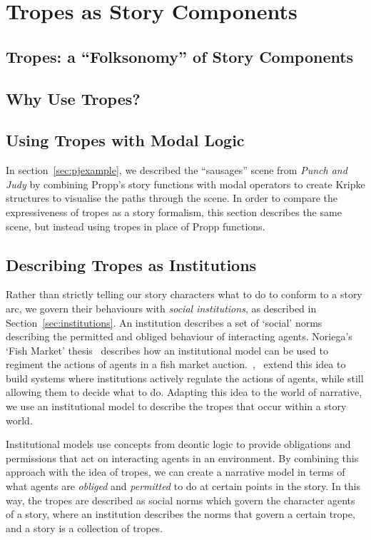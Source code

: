 \chapter{Tropes as Story Components}
\label{cha:tropes}
\section{Tropes: a ``Folksonomy'' of Story Components}

\section{Why Use Tropes?}

\section{Using Tropes with Modal Logic}
In section~\ref{sec:pjexample}, we described the ``sausages'' scene from
\emph{Punch and Judy} by combining Propp's story functions with modal operators
to create Kripke structures to visualise the paths through the scene. In order
to compare the expressiveness of tropes as a story formalism, this section
describes the same scene, but instead using tropes in place of Propp functions.


\section{Describing Tropes as Institutions} %
\label{sec:tropes-as-insts}
Rather than strictly telling our story characters what to do to conform to a
story arc, we govern their behaviours with \emph{social institutions}, as
described in Section~\ref{sec:institutions}. An institution describes a set of `social' norms describing the permitted and obliged behaviour of interacting agents. Noriega's `Fish Market' thesis~\cite{noriega1999agent} describes how an institutional model can be used to regiment the actions of agents in a fish market auction.~\cite{cliffe2007specifying},~\cite{lee2013decoupling} extend this idea to build systems where institutions actively regulate the actions of agents, while still allowing them to decide what to do. Adapting this idea to the world of narrative, we use an institutional model to describe the tropes that occur within a story world.

Institutional models use concepts from deontic logic to provide obligations and permissions that act on interacting agents in an environment. By combining this approach with the idea of tropes, we can create a narrative model in terms of what agents are \emph{obliged} and \emph{permitted} to do at certain points in the story. In this way, the tropes are described as social norms which govern the character agents of a story, where an institution describes the norms that govern a certain trope, and a story is a collection of tropes.

